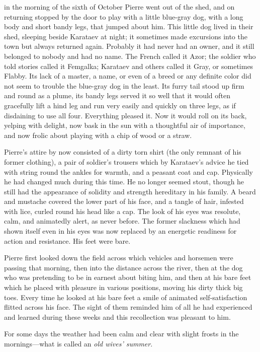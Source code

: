  in the morning of the sixth of October Pierre went out of
the shed, and on returning stopped by the door to play with a
little blue-gray dog, with a long body and short bandy legs, that
jumped about him.  This little dog lived in their shed, sleeping
beside Karataev at night; it sometimes made excursions into the
town but always returned again.  Probably it had never had an
owner, and it still belonged to nobody and had no name. The
French called it Azor; the soldier who told stories called it
Femgalka; Karataev and others called it Gray, or sometimes
Flabby. Its lack of a master, a name, or even of a breed or any
definite color did not seem to trouble the blue-gray dog in the
least. Its furry tail stood up firm and round as a plume, its
bandy legs served it so well that it would often gracefully lift
a hind leg and run very easily and quickly on three legs, as if
disdaining to use all four. Everything pleased it. Now it would
roll on its back, yelping with delight, now bask in the sun with
a thoughtful air of importance, and now frolic about playing with
a chip of wood or a straw.

Pierre's attire by now consisted of a dirty torn shirt (the only
remnant of his former clothing), a pair of soldier's trousers
which by Karataev's advice he tied with string round the ankles
for warmth, and a peasant coat and cap. Physically he had changed
much during this time.  He no longer seemed stout, though he
still had the appearance of solidity and strength hereditary in
his family. A beard and mustache covered the lower part of his
face, and a tangle of hair, infested with lice, curled round his
head like a cap. The look of his eyes was resolute, calm, and
animatedly alert, as never before. The former slackness which had
shown itself even in his eyes was now replaced by an energetic
readiness for action and resistance. His feet were bare.

Pierre first looked down the field across which vehicles and
horsemen were passing that morning, then into the distance across
the river, then at the dog who was pretending to be in earnest
about biting him, and then at his bare feet which he placed with
pleasure in various positions, moving his dirty thick big
toes. Every time he looked at his bare feet a smile of animated
self-satisfaction flitted across his face.  The sight of them
reminded him of all he had experienced and learned during these
weeks and this recollection was pleasant to him.

For some days the weather had been calm and clear with slight
frosts in the mornings---what is called an \emph{old wives'
summer}.

